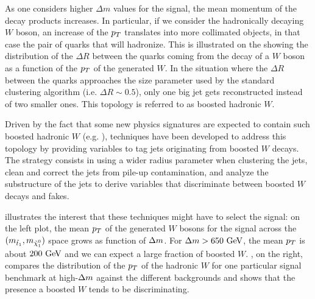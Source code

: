      As one considers higher $\Delta m$ values for the signal, the mean momentum of
     the decay products increases. In particular, if we consider the hadronically
     decaying $W$ boson, an increase of the $p_T$ translates into more collimated objects,
     in that case the pair of quarks that will hadronize. This is illustrated on
     the  showing the
     distribution of the $\Delta R$ between the
     quarks coming from the decay of a $W$ boson as a function of the $p_T$ of
     the generated
     $W$. In the situation where the $\Delta R$ between the quarks approaches the
     size parameter used by the standard clustering algorithm (i.e. $\Delta R
     \sim 0.5$), only one big jet gets reconstructed instead of two smaller ones.
     This topology is referred to as boosted hadronic $W$.


     Driven by the fact that some new physics signatures are expected to contain
     such boosted hadronic $W$ (e.g. \cite{SUS-12-024}), techniques have been developed to
     address this topology by providing variables to tag jets originating from
     boosted $W$ decays. The strategy consists in using a wider radius parameter
     when clustering the jets, clean and correct the jets from pile-up contamination,
     and analyze the substructure of the jets to derive variables that discriminate
     between boosted $W$ decays and fakes.

      illustrates the interest that these techniques might have to
     select the signal: on the left plot, the mean $p_T$ of the generated
     $W$ bosons for the signal across the $(m_{\tilde{t}_1}, m_{\tilde{\chi}_1^0})$
     space grows as function of $\Delta m$. For $\Delta m > 650~\text{GeV}$, the
     mean $p_T$ is about $200~\text{GeV}$ and we can expect a large fraction of boosted $W$.
     , on the right, compares the distribution of the $p_T$ of the
     hadronic $W$ for one particular signal benchmark at high-$\Delta m$ against
     the different backgrounds and shows that the presence a boosted $W$ tends to
     be discriminating.

